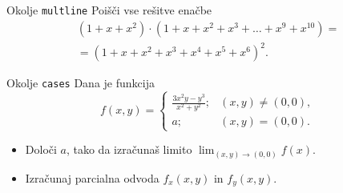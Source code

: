 \begin{frame}{Okolje \texttt{multline}}
	Poišči vse rešitve enačbe
	\begin{multline*}
	(1+x+x^2) \cdot (1+x+x^2+x^3+\ldots+x^9+x^{10}) = \\
	=(1+x+x^2+x^3+x^4+x^5+x^6)^2.
	\end{multline*}
\end{frame}

\begin{frame}{Okolje \texttt{cases}}
	Dana je funkcija
	\[
	f(x,y) =
	\begin{cases}
	\frac{3x^2y-y^3}{x^2+y^2}; & (x,y)\neq(0,0),\\
	a; &  (x,y)=(0,0).
	\end{cases}
	\]
		
	\begin{itemize}
	\item Določi $a$, tako da izračunaš limito \(\lim_{(x,y)\to(0,0)} f(x). \)
	\item Izračunaj parcialna odvoda $f_x(x,y)$ in $f_y(x,y)$.
	\end{itemize}
\end{frame}
